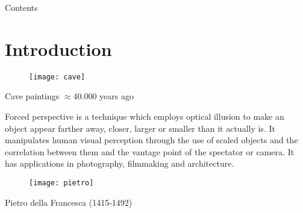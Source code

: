 


\subtitle{Image Formation}





\begin{frame}
\titlepage %
\end{frame}


\begin{frame}{Contents}
\setcounter{tocdepth}{1}
\tableofcontents
\end{frame}


\section{Introduction}

\begin{frame}
\centering
\begin{figure}[!h]
\centering
\texttt{[image: cave]}
\end{figure}
Cave paintings $\approx$40.000 years ago
\end{frame}

\begin{frame}
\begin{block}{Forced perspective}
is a technique which employs optical illusion to make an object appear farther away, closer, larger or smaller than it actually is. It manipulates human visual perception through the use of scaled objects and the correlation between them and the vantage point of the spectator or camera. It has applications in photography, filmmaking and architecture.
\end{block}
\end{frame}

\begin{frame}
\centering
\begin{figure}[!h]
\centering
\texttt{[image: pietro]}
\end{figure}
Pietro della Francesca (1415-1492)
\end{frame}

